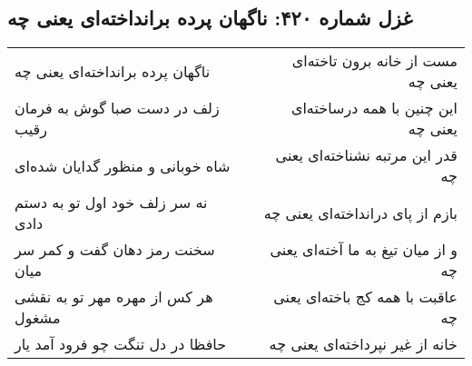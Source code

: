 \begin{center}
\section*{غزل شماره ۴۲۰: ناگهان پرده برانداخته‌ای یعنی چه}
\label{sec:sh420}
\begin{longtable}{l p{0.5cm} r}
ناگهان پرده برانداخته‌ای یعنی چه
&&
مست از خانه برون تاخته‌ای یعنی چه
\\
زلف در دست صبا گوش به فرمان رقیب
&&
این چنین با همه درساخته‌ای یعنی چه
\\
شاه خوبانی و منظور گدایان شده‌ای
&&
قدر این مرتبه نشناخته‌ای یعنی چه
\\
نه سر زلف خود اول تو به دستم دادی
&&
بازم از پای درانداخته‌ای یعنی چه
\\
سخنت رمز دهان گفت و کمر سر میان
&&
و از میان تیغ به ما آخته‌ای یعنی چه
\\
هر کس از مهره مهر تو به نقشی مشغول
&&
عاقبت با همه کج باخته‌ای یعنی چه
\\
حافظا در دل تنگت چو فرود آمد یار
&&
خانه از غیر نپرداخته‌ای یعنی چه
\\
\end{longtable}
\end{center}
